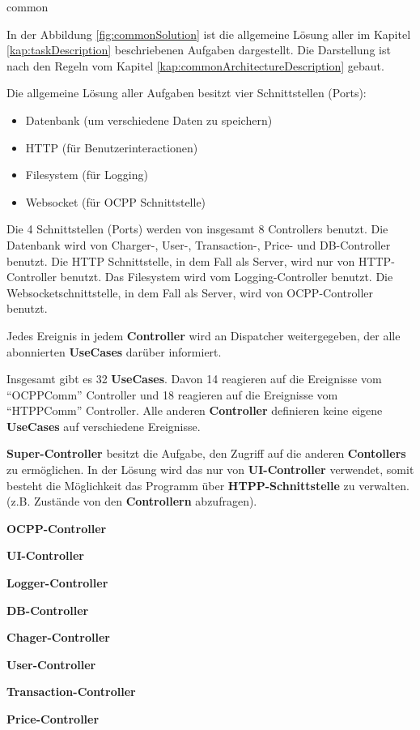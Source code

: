 {common}

In der Abbildung \ref{fig:commonSolution} ist die allgemeine Lösung aller im Kapitel \ref{kap:taskDescription} beschriebenen Aufgaben dargestellt.
Die Darstellung ist nach den Regeln vom Kapitel \ref{kap:commonArchitectureDescription} gebaut.

Die allgemeine Lösung aller Aufgaben besitzt vier Schnittstellen (Ports):
\begin{itemize}
    \item Datenbank (um verschiedene Daten zu speichern)
    \item HTTP (für Benutzerinteractionen)
    \item Filesystem (für Logging)
    \item Websocket (für OCPP Schnittstelle)
\end{itemize}

Die 4 Schnittstellen (Ports) werden von insgesamt 8 Controllers benutzt.
Die Datenbank wird von Charger-, User-, Transaction-, Price- und DB-Controller benutzt.
Die HTTP Schnittstelle, in dem Fall als Server, wird nur von HTTP-Controller benutzt.
Das Filesystem wird vom Logging-Controller benutzt.
Die Websocketschnittstelle, in dem Fall als Server, wird von OCPP-Controller benutzt.

Jedes Ereignis in jedem \textbf{Controller} wird an Dispatcher weitergegeben, der alle abonnierten \textbf{UseCases} darüber informiert.

Insgesamt gibt es 32 \textbf{UseCases}. 
Davon 14 reagieren auf die Ereignisse vom ``OCPPComm'' Controller und 18 reagieren auf die Ereignisse vom ``HTPPComm'' Controller. 
Alle anderen \textbf{Controller} definieren keine eigene \textbf{UseCases} auf verschiedene Ereignisse.

\textbf{Super-Controller} besitzt die Aufgabe, den Zugriff auf die anderen \textbf{Contollers} zu ermöglichen. 
In der Lösung wird das nur von \textbf{UI-Controller} verwendet, somit besteht die Möglichkeit das Programm über \textbf{HTPP-Schnittstelle} zu verwalten. 
(z.B. Zustände von den \textbf{Controllern} abzufragen).

\textbf{OCPP-Controller}

\textbf{UI-Controller}

\textbf{Logger-Controller}

\textbf{DB-Controller}

\textbf{Chager-Controller}

\textbf{User-Controller}

\textbf{Transaction-Controller}

\textbf{Price-Controller}